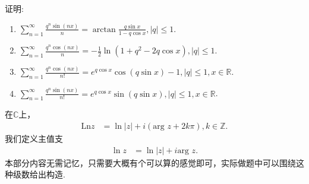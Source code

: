 \documentclass[../../main.tex]{subfiles}
\begin{document}
\begin{proposition}\label{proposition:常用级数公式1}
证明:
\begin{enumerate}[(1)]
\item \(\sum_{n = 1}^{\infty} \frac{q^{n} \sin(nx)}{n}= \arctan \frac{q \sin x}{1 - q \cos x}, |q| \leqslant 1\).

\item \(\sum_{n = 1}^{\infty} \frac{q^{n} \cos(nx)}{n}= -\frac{1}{2} \ln(1 + q^{2} - 2q \cos x), |q| \leqslant 1\).

\item \(\sum_{n = 1}^{\infty} \frac{q^{n} \cos(nx)}{n!}= e^{q \cos x} \cos(q \sin x) - 1, |q| \leqslant 1, x \in \mathbb{R}\).

\item \(\sum_{n = 1}^{\infty} \frac{q^{n} \sin(nx)}{n!}= e^{q \cos x} \sin(q \sin x), |q| \leqslant 1, x \in \mathbb{R}\).
\end{enumerate}
\end{proposition}
\begin{note}
在\(\mathbb{C}\)上，
\begin{align*}
\text{Ln}z &= \ln|z| + i(\text{arg }z + 2k\pi), k \in \mathbb{Z}.  
\end{align*}
我们定义主值支
\begin{align*}
\ln z &= \ln|z| + i\text{arg }z. 
\end{align*}
本部分内容无需记忆，只需要大概有个可以算的感觉即可，实际做题中可以围绕这种级数给出构造.
\end{note}
\end{document}
